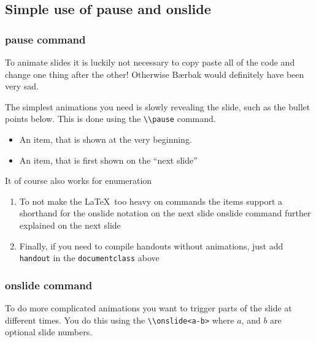 \documentclass[english, aspectratio=169]{beamer}
\begin{document}
\subsection{Simple use of pause and onslide}
\begin{frame}
  \frametitle{pause command}
  To animate slides it is luckily not necessary to copy paste all of the code
  and change one thing after the other! Otherwise Bærbak would definitely have
  been very sad.
  
  The simplest animations you need is slowly revealing the slide, such as the
  bullet points below. This is done using the \lstinline{\\pause}
  command.

  \begin{itemize}
  \item An item, that is shown at the very beginning.

    \pause
    
  \item An item, that is first shown on the ``next slide''
  \end{itemize}

  \pause

  It of course also works for enumeration
  \begin{enumerate}
  \item<+-> To not make the \LaTeX\ too heavy on commands the items support a
    shorthand for the onslide notation on the next slide
    onslide command further explained on the next slide
  \item<+-> Finally, if you need to compile handouts without animations, just add
    \lstinline{handout} in the \lstinline{documentclass} above
  \end{enumerate}
\end{frame}

\begin{frame}
  \frametitle{onslide command}

  To do more complicated animations you want to trigger parts of the slide at
  different times. You do this using the \lstinline{\\onslide<a-b>} where $a$,
  and $b$ are optional slide numbers.




\end{frame}
\end{document}

